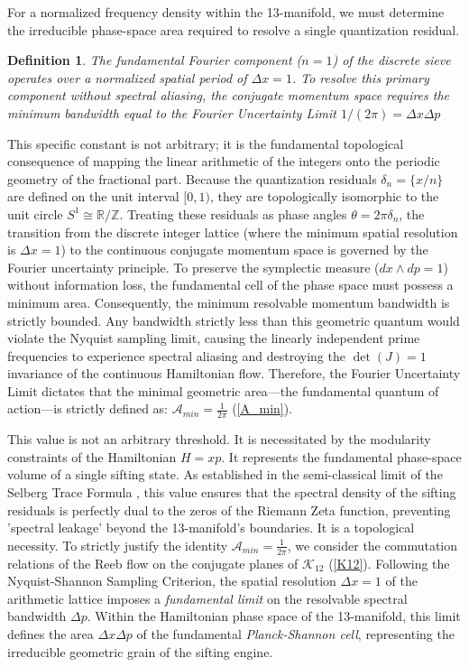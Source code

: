 \documentclass[sn-mathphys-num, pdflatex, referee]{sn-jnl}
\newtheorem{definition}[theorem]{Definition}
\begin{document}
For a normalized frequency density within the 13-manifold, we must determine the irreducible phase-space area required to resolve a single quantization residual. 
\begin{definition}
The fundamental Fourier component ($n=1$) of the discrete sieve operates over a normalized spatial period of $\Delta x = 1$. To resolve this primary component without spectral aliasing, the conjugate momentum space requires the minimum bandwidth  equal to \label{Fourier Uncertainty Limit} the Fourier Uncertainty Limit $1/(2\pi)=\Delta x\Delta p$ 
\end{definition}
This specific constant is not arbitrary; it is the fundamental topological consequence of mapping the linear arithmetic of the integers onto the periodic geometry of the fractional part. Because the quantization residuals $\delta_n = \{x/n\}$ are defined on the unit interval $[0, 1)$, they are topologically isomorphic to the unit circle $S^1 \cong \mathbb{R}/\mathbb{Z}$. Treating these residuals as phase angles $\theta = 2\pi \delta_n$, the transition from the discrete integer lattice (where the minimum spatial resolution is $\Delta x = 1$) to the continuous conjugate momentum space is governed by the Fourier uncertainty principle. To preserve the symplectic measure ($dx \wedge dp = 1$) without information loss, the fundamental cell of the phase space must possess a minimum area. Consequently, the minimum resolvable momentum bandwidth is strictly bounded. Any bandwidth strictly less than this geometric quantum would violate the Nyquist sampling limit, causing the linearly independent prime frequencies to experience spectral aliasing \cite{shannon1949communication} and destroying the $\det(J)=1$ invariance of the continuous Hamiltonian flow. Therefore, the Fourier Uncertainty Limit dictates that the minimal geometric area---the fundamental quantum of action---is strictly defined as:
$\mathcal{A}_{min} = \frac{1}{2\pi}$ (\ref{A_min}).

This value is not an arbitrary threshold. It is necessitated by the modularity constraints of the Hamiltonian $H=xp$. It represents the fundamental phase-space volume of a single sifting state. As established in the semi-classical limit of the Selberg Trace Formula \cite{berry1999hxp, berry1999riemann}, this value ensures that the spectral density of the sifting residuals is perfectly dual to the zeros of the Riemann Zeta function, preventing 'spectral leakage' beyond the 13-manifold's boundaries. It is a topological necessity. To strictly justify the identity $\mathcal{A}_{min} = \frac{1}{2\pi}$, we consider the commutation relations of the Reeb flow on the conjugate planes of $\mathcal{K}_{12}$ (\ref{K12}). Following the Nyquist-Shannon Sampling Criterion, the spatial resolution $\Delta x = 1$ of the arithmetic lattice imposes a \textit{fundamental limit} on the resolvable spectral bandwidth $\Delta p$. Within the Hamiltonian phase space of the 13-manifold, this limit defines the area $\Delta x\Delta p$ of the fundamental \textit{Planck-Shannon cell}, representing the irreducible geometric grain of the sifting engine.  
\end{document}

